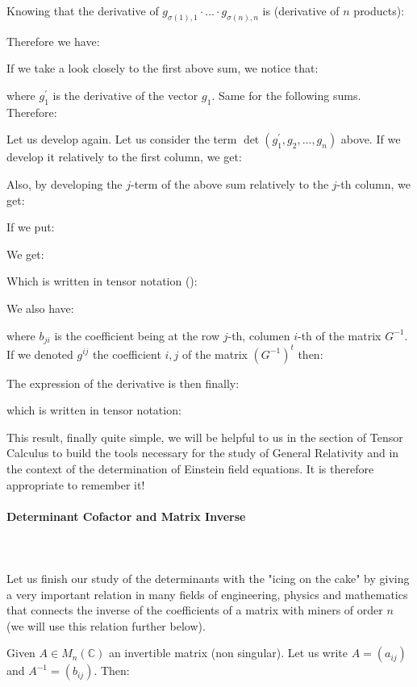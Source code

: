 	Knowing that the derivative of $g_{\sigma(1),1}\cdot \ldots \cdot g_{\sigma(n),n}$ is (derivative of $n$ products):
	
	Therefore we have:
	
	If we take a look closely to the first above sum, we notice that:
	
	where $g_1^{'}$ is the derivative of the vector $g_1$. Same for the following sums. Therefore:
	
	Let us develop again. Let us consider the term $\det(g_1^{'},g_2,\ldots,g_n)$ above. If we develop it relatively to the first column, we get:
	
	 Also, by developing the $j$-term of the above sum relatively to the $j$-th column, we get:
	
	If we put:
	
	We get:
	
	Which is written in tensor notation ():
	
	We also have:
	
	where $b_{ji}$ is the coefficient being at the row $j$-th, columen $i$-th of the matrix $G^{-1}$. If we denoted $g^{ij}$ the coefficient $i,j$ of the matrix $(G^{-1})^t$ then:
	
	The expression of the derivative is then finally:
	
	which is written in tensor notation:
	
	This result, finally quite simple, we will be helpful to us in the section of Tensor Calculus to build the tools necessary for the study of General Relativity and in the context of the determination of Einstein field equations. It is therefore appropriate to remember it!
	
	\paragraph{Determinant Cofactor and Matrix Inverse}\mbox{}\\\\
	Let us finish our study of the determinants with the "icing on the cake" by giving a very important relation in many fields of engineering, physics and mathematics that connects the inverse of the coefficients of a matrix with miners of order $n$ (we will use this relation further below).
	
	Given $A\in M_n(\mathbb{C})$ an invertible matrix (non singular). Let us write $A=(a_{ij})$ and $A^{-1}=(b_{ij})$. Then:
	
